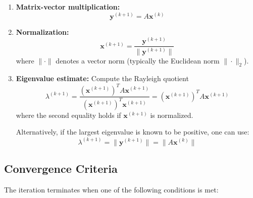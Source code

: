 \documentclass[11pt, a4paper]{article}
\begin{document}
\begin{enumerate}
    \item \textbf{Matrix-vector multiplication:}
    \begin{equation}
        \mathbf{y}^{(k+1)} = A\mathbf{x}^{(k)}
    \end{equation}
    
    \item \textbf{Normalization:}
    \begin{equation}
        \mathbf{x}^{(k+1)} = \frac{\mathbf{y}^{(k+1)}}{\|\mathbf{y}^{(k+1)}\|}
    \end{equation}
    where $\|\cdot\|$ denotes a vector norm (typically the Euclidean norm $\|\cdot\|_2$).
    
    \item \textbf{Eigenvalue estimate:} Compute the Rayleigh quotient
    \begin{equation}
        \lambda^{(k+1)} = \frac{(\mathbf{x}^{(k+1)})^T A \mathbf{x}^{(k+1)}}{(\mathbf{x}^{(k+1)})^T \mathbf{x}^{(k+1)}} = (\mathbf{x}^{(k+1)})^T A \mathbf{x}^{(k+1)}
    \end{equation}
    where the second equality holds if $\mathbf{x}^{(k+1)}$ is normalized.
    
    Alternatively, if the largest eigenvalue is known to be positive, one can use:
    \begin{equation}
        \lambda^{(k+1)} = \|\mathbf{y}^{(k+1)}\| = \|A\mathbf{x}^{(k)}\|
    \end{equation}
\end{enumerate}

\subsection{Convergence Criteria}

The iteration terminates when one of the following conditions is met:
\end{document}
